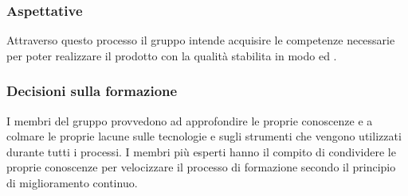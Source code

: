 \subsubsection{Aspettative}
Attraverso questo processo il gruppo intende acquisire le competenze necessarie per poter realizzare il prodotto con la qualità stabilita in modo  ed .
\subsubsection{Decisioni sulla formazione}\label{DecisioniFormazione}
I membri del gruppo provvedono ad approfondire le proprie conoscenze e a colmare le proprie lacune sulle tecnologie e sugli strumenti che vengono utilizzati durante tutti i processi. I membri più esperti hanno il compito di condividere le proprie conoscenze per velocizzare il processo di formazione secondo il principio di miglioramento continuo.